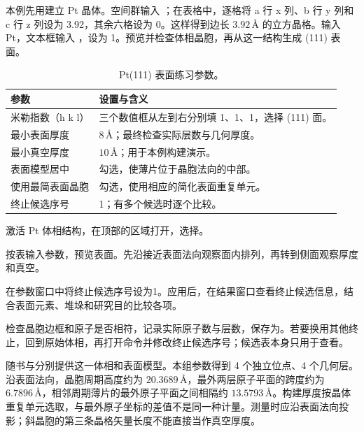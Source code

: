 本例先用建立 Pt 晶体。空间群输入 ；在表格中，逐格将 a 行 x 列、b 行 y 列和 c 行 z 列设为 3.92，其余六格设为 0。这样得到边长 $3.92\,\text{\AA}$ 的立方晶格。输入 Pt，文本框输入 ，设为 1。预览并检查体相晶胞，再从这一结构生成 (111) 表面。

\begin{table}[htbp]
\centering
\caption{Pt(111) 表面练习参数。}
\begin{tabularx}{\linewidth}{lX}
\toprule
参数 & 设置与含义 \\
\midrule
米勒指数（h k l） & 三个数值框从左到右分别填 1、1、1，选择 (111) 面。\\
最小表面厚度 & $8\,\text{\AA}$；最终检查实际层数与几何厚度。\\
最小真空厚度 & $10\,\text{\AA}$；用于本例构建演示。\\
表面模型居中 & 勾选，使薄片位于晶胞法向的中部。\\
使用最简表面晶胞 & 勾选，使用相应的简化表面重复单元。\\
终止候选序号 & 1；有多个候选时逐个比较。\\
\bottomrule
\end{tabularx}
\end{table}

\begin{steps}
  \item 激活 Pt 体相结构，在顶部的区域打开，选择。
  \item 按表输入参数，预览表面。先沿接近表面法向观察面内排列，再转到侧面观察厚度和真空。
  \item 在参数窗口中将终止候选序号设为1。应用后，在结果窗口查看终止候选信息，结合表面元素、堆垛和研究目的比较各项。
  \item 检查晶胞边框和原子是否相符，记录实际原子数与层数，保存为。若要换用其他终止，回到原始体相，再打开命令并修改终止候选序号；候选表本身只用于查看。
\end{steps}



随书与分别提供这一体相和表面模型。本组参数得到 4 个独立位点、4 个几何层。沿表面法向，晶胞周期高度约为 $20.3689\,\text{\AA}$，最外两层原子平面的跨度约为 $6.7896\,\text{\AA}$，相邻周期薄片的最外原子平面之间相隔约 $13.5793\,\text{\AA}$。构建厚度按晶体重复单元选取，与最外原子坐标的差值不是同一种计量。测量时应沿表面法向投影；斜晶胞的第三条晶格矢量长度不能直接当作真空厚度。

